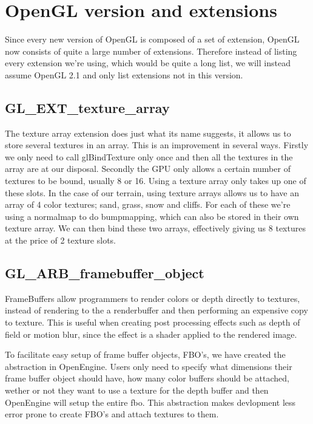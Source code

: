 \section{OpenGL version and extensions}

Since every new version of OpenGL is composed of a set of extension,
OpenGL now consists of quite a large number of extensions. Therefore
instead of listing every extension we're using, which would be quite a
long list, we will instead assume OpenGL 2.1 and only list extensions
not in this version.

\subsection{GL\_EXT\_texture\_array}

The texture array extension does just what its name suggests, it
allows us to store several textures in an array. This is an
improvement in several ways. Firstly we only need to call
glBindTexture only once and then all the textures in the array are at
our disposal. Secondly the GPU only allows a certain number of
textures to be bound, usually 8 or 16. Using a texture array only
takes up one of these slots. In the case of our terrain, using texture
arrays allows us to have an array of 4 color textures; sand, grass,
snow and cliffs. For each of these we're using a normalmap to do
bumpmapping, which can also be stored in their own texture array. We
can then bind these two arrays, effectively giving us 8 textures at
the price of 2 texture slots.

\subsection{GL\_ARB\_framebuffer\_object}

FrameBuffers allow programmers to render colors or depth directly to
textures, instead of rendering to the a renderbuffer and then performing
an expensive copy to texture. This is useful when creating post
processing effects such as depth of field or motion blur, since the
effect is a shader applied to the rendered image.


To facilitate easy setup of frame buffer objects, FBO's, we have
created the  abstraction in OpenEngine. Users only need to
specify what dimensions their frame buffer object should have, how
many color buffers should be attached, wether or not they want to use
a texture for the depth buffer and then OpenEngine will setup the
entire fbo. This abstraction makes devlopment less error prone to
create FBO's and attach textures to them.



